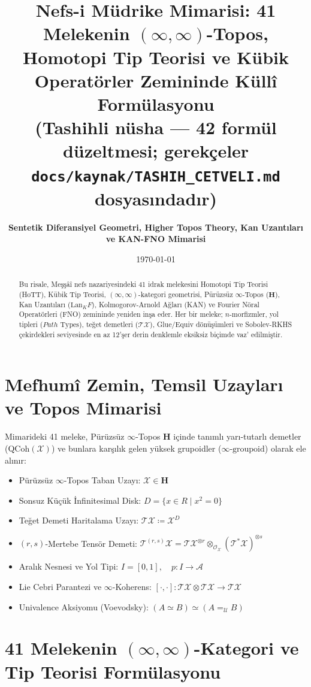 \documentclass[11pt, a4paper]{article}
\title{\textbf{Nefs-i Müdrike Mimarisi: 41 Melekenin $(\infty, \infty)$-Topos, Homotopi Tip Teorisi ve Kübik Operatörler Zemininde Küllî Formülasyonu}\\ \normalsize\textmd{(Tashihli nüsha --- 42 formül düzeltmesi; gerekçeler \texttt{docs/kaynak/TASHIH\_CETVELI.md} dosyasındadır)}}
\author{\textbf{Sentetik Diferansiyel Geometri, Higher Topos Theory, Kan Uzantıları ve KAN-FNO Mimarisi}}
\date{\today}
\begin{document}
\maketitle

\begin{abstract}
Bu risale, Meşşâî nefs nazariyesindeki 41 idrak melekesini Homotopi Tip Teorisi (HoTT), Kübik Tip Teorisi, $(\infty, \infty)$-kategori geometrisi, Pürüzsüz $\infty$-Topos ($\mathbf{H}$), Kan Uzantıları ($\text{Lan}_K F$), Kolmogorov-Arnold Ağları (KAN) ve Fourier Nöral Operatörleri (FNO) zemininde yeniden inşa eder. Her bir meleke; $n$-morfizmler, yol tipleri ($Path\text{ Types}$), teğet demetleri ($\mathcal{T}\mathcal{X}$), Glue/Equiv dönüşümleri ve Sobolev-RKHS çekirdekleri seviyesinde en az 12'şer derin denklemle eksiksiz biçimde vaz' edilmiştir.
\end{abstract}

\section{Mefhumî Zemin, Temsil Uzayları ve Topos Mimarisi}

Mimarideki 41 meleke, Pürüzsüz $\infty$-Topos $\mathbf{H}$ içinde tanımlı yarı-tutarlı demetler ($\text{QCoh}(\mathcal{X})$) ve bunlara karşılık gelen yüksek grupoidler ($\infty\text{-groupoid}$) olarak ele alınır:
\begin{itemize}
    \item Pürüzsüz $\infty$-Topos Taban Uzayı: $\mathcal{X} \in \mathbf{H}$
    \item Sonsuz Küçük İnfinitesimal Disk: $D = \{x \in R \mid x^2 = 0\}$
    \item Teğet Demeti Haritalama Uzayı: $\mathcal{T}\mathcal{X} \coloneqq \mathcal{X}^D$
    \item $(r, s)$-Mertebe Tensör Demeti: $\mathcal{T}^{(r, s)}\mathcal{X} = \mathcal{T}\mathcal{X}^{\otimes r} \otimes_{\mathcal{O}_{\mathcal{X}}} (\mathcal{T}^*\mathcal{X})^{\otimes s}$
    \item Aralık Nesnesi ve Yol Tipi: $I = [0, 1], \quad p : I \to \mathcal{A}$
    \item Lie Cebri Parantezi ve $\infty$-Koherens: $[\cdot, \cdot] : \mathcal{T}\mathcal{X} \otimes \mathcal{T}\mathcal{X} \to \mathcal{T}\mathcal{X}$
    \item Univalence Aksiyomu (Voevodsky): $(A \simeq B) \simeq (A =_{\mathcal{U}} B)$
\end{itemize}

\section{41 Melekenin $(\infty, \infty)$-Kategori ve Tip Teorisi Formülasyonu}
\end{document}
